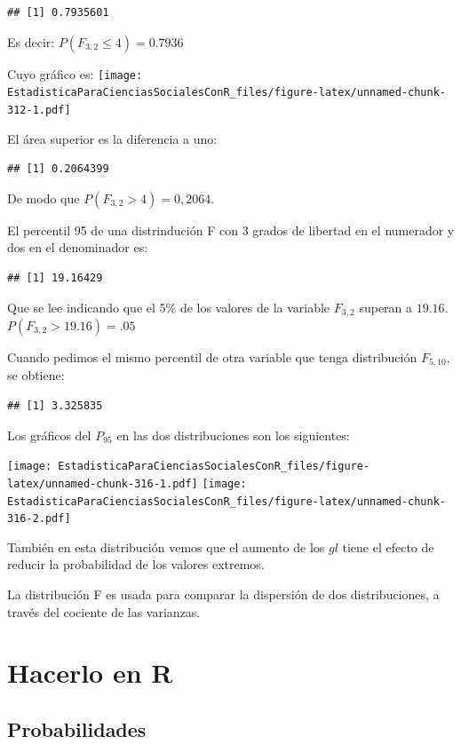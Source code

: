 \documentclass[]{book}
\begin{document}
\begin{verbatim}
## [1] 0.7935601
\end{verbatim}

Es decir: \(P(F_{3,2} \leq 4)=0.7936\)

Cuyo gráfico es:
\texttt{[image: EstadisticaParaCienciasSocialesConR\_files/figure-latex/unnamed-chunk-312-1.pdf]}

El área superior es la diferencia a uno:

\begin{verbatim}
## [1] 0.2064399
\end{verbatim}

De modo que \(P(F_{3,2} > 4) = 0,2064\).

El percentil 95 de una distrindución F con 3 grados de libertad en el numerador y dos en el denominador es:

\begin{verbatim}
## [1] 19.16429
\end{verbatim}

Que se lee indicando que el 5\% de los valores de la variable \(F_{3,2}\) superan a \(19.16\). \(P(F_{3,2}>19.16)=.05\)

Cuando pedimos el mismo percentil de otra variable que tenga distribución \(F_{5,10}\), se obtiene:

\begin{verbatim}
## [1] 3.325835
\end{verbatim}

Los gráficos del \(P_{95}\) en las dos distribuciones son los siguientes:

\texttt{[image: EstadisticaParaCienciasSocialesConR\_files/figure-latex/unnamed-chunk-316-1.pdf]} \texttt{[image: EstadisticaParaCienciasSocialesConR\_files/figure-latex/unnamed-chunk-316-2.pdf]}

También en esta distribución vemos que el aumento de los \(gl\) tiene el
efecto de reducir la probabilidad de los valores extremos.

La distribución F es usada para comparar la dispersión de dos
distribuciones, a través del cociente de las varianzas.

\hypertarget{hacerlo-en-r-5}{%
\section{Hacerlo en R}\label{hacerlo-en-r-5}}

\hypertarget{probabilidades}{%
\subsection{Probabilidades}\label{probabilidades}}
\end{document}
